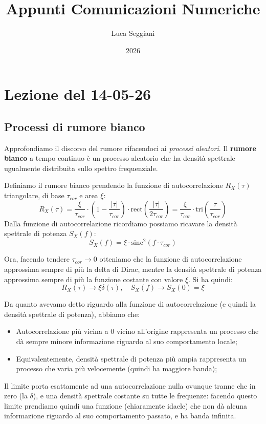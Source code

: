 \documentclass[a4paper,11pt]{article}
\title{Appunti Comunicazioni Numeriche}
\author{Luca Seggiani}
\date{2026}
\begin{document}
\section{Lezione del 14-05-26}

\thispagestyle{empty}
\pagestyle{fancy}

\subsection{Processi di rumore bianco}
Approfondiamo il discorso del rumore rifacendoci ai \textit{processi aleatori}. Il \textbf{rumore bianco} a tempo continuo è un processo aleatorio che ha densità spettrale ugualmente distribuita sullo spettro frequenziale.

Definiamo il rumore bianco prendendo la funzione di autocorrelazione $R_X(\tau)$ triangolare, di base $\tau_{cor}$ e area $\xi$:
$$
R_X(\tau)
= \frac{\xi}{\tau_{cor}} \cdot \left( 1 - \frac{|\tau|}{\tau_{cor}} \right) \cdot \mathrm{rect} \left( \frac{|\tau|}{2\tau_{cor}} \right)
= \frac{\xi}{\tau_{cor}} \cdot \mathrm{tri} \left( \frac{\tau}{\tau_{cor}} \right)
$$
Dalla funzione di autocorrelazione ricordiamo possiamo ricavare la densità spettrale di potenza $S_X(f)$:
$$
S_X(f) = \xi \cdot \mathrm{sinc}^2 \left( f \cdot \tau_{cor} \right)
$$

Ora, facendo tendere $\tau_{cor} \rightarrow 0$ otteniamo che la funzione di autocorrelazione approssima sempre di più la delta di Dirac, mentre la densità spettrale di potenza approssima sempre di più la funzione costante con valore $\xi$. Si ha quindi:
$$
R_X(\tau) \rightarrow \xi \delta(\tau), \quad S_X(f) \rightarrow S_X(0) = \xi
$$

Da quanto avevamo detto riguardo alla funzione di autocorrelazione (e quindi la densità spettrale di potenza), abbiamo che:
\begin{itemize}
	\item Autocorrelazione più vicina a $0$ vicino all'origine rappresenta un processo che dà sempre minore informazione riguardo al suo comportamento locale; 
	\item Equivalentemente, densità spettrale di potenza più ampia rappresenta un processo che varia più velocemente (quindi ha maggiore banda); 
\end{itemize}
Il limite porta esattamente ad una autocorrelazione nulla ovunque tranne che in zero (la $\delta$), e una densità spettrale costante su tutte le frequenze: facendo questo limite prendiamo quindi una funzione (chiaramente idaele) che non dà alcuna informazione riguardo al suo comportamento passato, e ha banda infinita.
\end{document}
